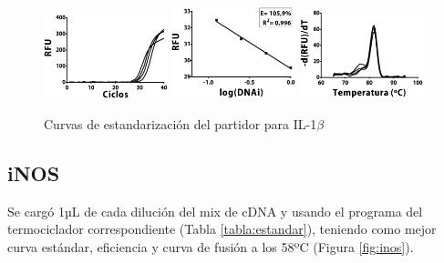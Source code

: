 \documentclass[12pt,letterpaper,oneside]{scrbook}
\begin{document}
\begin{figure}[h!]
\centering
        {\includegraphics[width=0.32\textwidth]{standarization/il1b/ampl}}
        {\includegraphics[width=0.32\textwidth]{standarization/il1b/stand}}
        {\includegraphics[width=0.32\textwidth]{standarization/il1b/melting}}
        \caption{Curvas de estandarización del partidor para IL-1$\beta$}
    \label {fig:il1b}
\end{figure}

\subsection{iNOS}

Se cargó 1µL de cada dilución del mix de cDNA y usando el programa del
termociclador correspondiente (Tabla \ref{tabla:estandar}), teniendo
como mejor curva estándar, eficiencia y curva de fusión a los 58ºC
(Figura \ref{fig:inos}).
\end{document}
